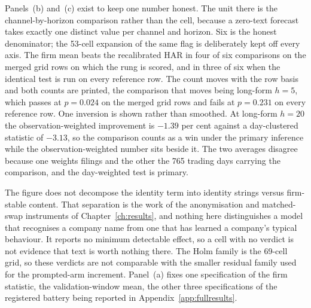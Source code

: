 Panels~(b) and~(c) exist to keep one number honest. The unit there is the
channel-by-horizon comparison rather than the cell, because a zero-text
forecast takes exactly one distinct value per channel and horizon. Six is
the honest denominator; the 53-cell expansion of the same flag is
deliberately kept off every axis. The firm mean beats the recalibrated HAR in
four of six comparisons on the merged grid rows on which the rung is scored,
and in three of six when the identical test is run on every reference row. The
count moves with the row basis and both counts are printed, the comparison
that moves being long-form $h=5$, which passes at $p=0.024$ on the merged grid
rows and fails at $p=0.231$ on every reference row. %
One inversion is shown rather than smoothed. At long-form $h=20$ the
observation-weighted improvement is $-1.39$ per cent against a day-clustered
statistic of $-3.13$, so the comparison counts as a win under the primary
inference while the observation-weighted number sits beside it. %
The two averages disagree because one weights filings and the other the 765
trading days carrying the comparison, and the day-weighted test is primary.

The figure does not decompose the identity term into identity strings versus
firm-stable content. That separation is the work of the anonymisation and
matched-swap instruments of Chapter~\ref{ch:results}, and nothing here
distinguishes a model that recognises a company name from one that has learned
a company's typical behaviour. It reports no minimum detectable effect, so a
cell with no verdict is not evidence that text is worth nothing there. The
Holm family is the 69-cell grid, so these verdicts are not comparable with the
smaller residual family used for the prompted-arm increment. Panel~(a)
fixes one specification of the firm statistic, the validation-window mean, the
other three specifications of the registered battery being reported in
Appendix~\ref{app:fullresults}.

